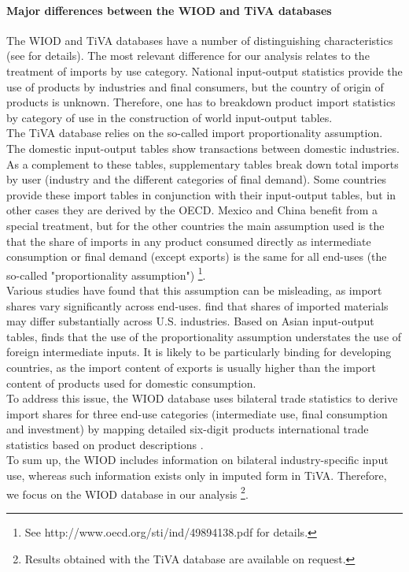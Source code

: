 \documentclass[11pt,a4paper]{article}
\begin{document}
\paragraph{Major differences between the WIOD and TiVA databases}
The WIOD and TiVA databases have a number of distinguishing characteristics (see \cite{Timmer2015} for details). The most relevant difference for our analysis relates to the treatment of imports by use category. National input-output statistics provide the use of products by industries and final consumers, but the country of origin of products is unknown. Therefore, one has to breakdown product import statistics by category of use in the construction of world input-output tables.\\
The TiVA database relies on the so-called import proportionality assumption. The domestic input-output tables show transactions between domestic industries. As a complement to these tables, supplementary tables break down total imports by user (industry and the different categories of final demand). Some countries provide these import tables in conjunction with their input-output tables, but in other cases they are derived by the OECD. Mexico and China benefit from a special treatment, but for the other countries the main assumption used is the that the share of imports in any product consumed directly as intermediate consumption or final demand (except exports) is the same for all end-uses (the so-called "proportionality assumption") \footnote{See http://www.oecd.org/sti/ind/49894138.pdf for details.}.\\
Various studies have found that this assumption can be misleading, as import shares vary significantly across end-uses. \cite{Feenstra2012} find that shares of imported materials may differ substantially across U.S. industries. Based on Asian input-output tables, \cite{Puzzello2012} finds that the use of the proportionality assumption understates the use of foreign intermediate inputs. It is likely to be particularly binding for developing countries, as the import content of exports is usually higher than the import content of products used for domestic consumption.\\
To address this issue, the WIOD database uses bilateral trade statistics to derive import shares for three end-use categories (intermediate use, final consumption and investment) by mapping detailed six-digit products international trade statistics based on product descriptions \citep{Dietzenbacher2013}.\\
To sum up, the WIOD includes information on bilateral industry-specific input use, whereas such information exists only in imputed form in TiVA. Therefore, we focus on the WIOD database in our analysis \footnote{Results obtained with the TiVA database are available on request.}. 
\end{document}
